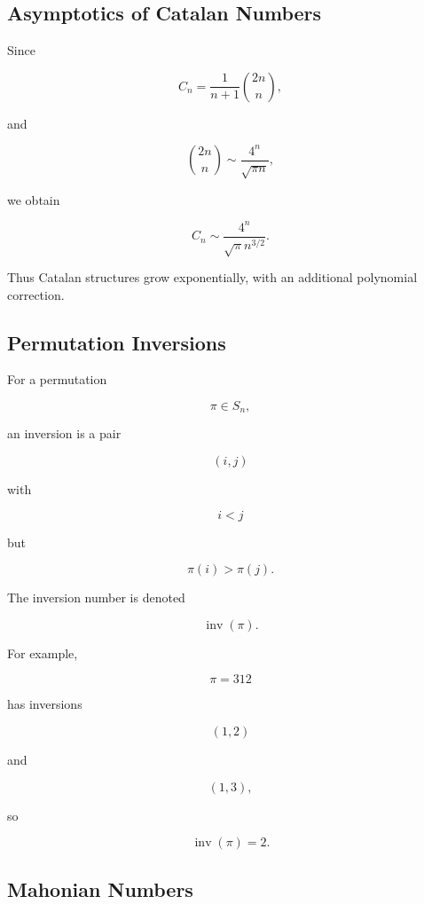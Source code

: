 \subsection{Asymptotics of Catalan Numbers}
\label{subsec:catalan-asymptotics}

Since

\[
C_n
=
\frac{1}{n+1}\binom{2n}{n},
\]

and

\[
\binom{2n}{n}
\sim
\frac{4^n}{\sqrt{\pi n}},
\]

we obtain

\[
\boxed{
C_n
\sim
\frac{4^n}{\sqrt{\pi}n^{3/2}}.
}
\]

Thus Catalan structures grow exponentially, with an additional
polynomial correction.

\subsection{Permutation Inversions}
\label{subsec:permutation-inversions}

For a permutation

\[
\pi\in S_n,
\]

an inversion is a pair

\[
(i,j)
\]

with

\[
i<j
\]

but

\[
\pi(i)>\pi(j).
\]

The inversion number is denoted

\[
\operatorname{inv}(\pi).
\]

For example,

\[
\pi=312
\]

has inversions

\[
(1,2)
\]

and

\[
(1,3),
\]

so

\[
\operatorname{inv}(\pi)=2.
\]

\subsection{Mahonian Numbers}
\label{subsec:mahonian-numbers}


